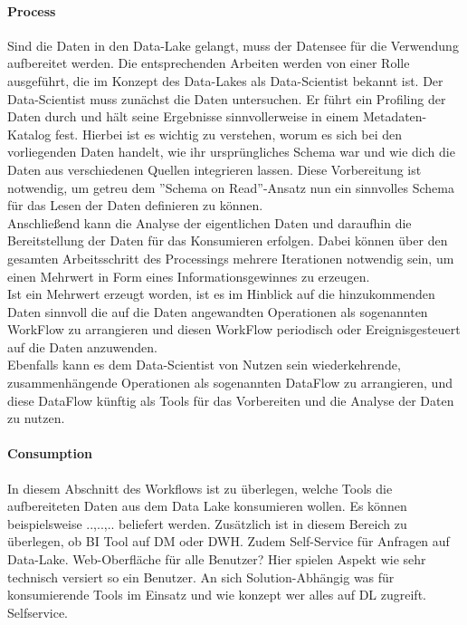 \documentclass[twoside,twocolumn]{article}
\begin{document}
\paragraph{Process}
		Sind die Daten in den Data-Lake gelangt, muss der Datensee für die Verwendung aufbereitet werden. Die entsprechenden Arbeiten werden von einer Rolle ausgeführt, die im Konzept des Data-Lakes als Data-Scientist bekannt ist.
		Der Data-Scientist muss zunächst die Daten untersuchen. Er führt ein Profiling der Daten durch und hält seine Ergebnisse sinnvollerweise in einem Metadaten-Katalog fest. Hierbei ist es wichtig zu verstehen, worum es sich bei den vorliegenden Daten handelt, wie ihr ursprüngliches Schema war und wie dich die Daten aus verschiedenen Quellen integrieren lassen. Diese Vorbereitung ist notwendig, um getreu dem ''Schema on Read''-Ansatz nun ein sinnvolles Schema für das Lesen der Daten definieren zu können.\\
		Anschließend kann die Analyse der eigentlichen Daten und daraufhin die Bereitstellung der Daten für das Konsumieren erfolgen. Dabei können über den gesamten Arbeitsschritt des Processings mehrere Iterationen notwendig sein, um einen Mehrwert in Form eines Informationsgewinnes zu erzeugen.\\
		Ist ein Mehrwert erzeugt worden, ist es im Hinblick auf die hinzukommenden Daten sinnvoll die auf die Daten angewandten Operationen als sogenannten WorkFlow zu arrangieren und diesen WorkFlow periodisch oder Ereignisgesteuert auf die Daten anzuwenden.\\
		Ebenfalls kann es dem Data-Scientist von Nutzen sein wiederkehrende, zusammenhängende Operationen als sogenannten DataFlow zu arrangieren, und diese DataFlow künftig als Tools für das Vorbereiten und die Analyse der Daten zu nutzen.\\
		\cite{src8}\cite{src12}
		
\paragraph{Consumption}
		In diesem Abschnitt des Workflows ist zu überlegen, welche Tools die aufbereiteten Daten aus dem Data Lake konsumieren wollen. Es können beispielsweise ..,..,.. beliefert werden.
		Zusätzlich ist in diesem Bereich zu überlegen, ob BI Tool auf DM oder DWH.
		Zudem Self-Service für Anfragen auf Data-Lake. Web-Oberfläche für alle Benutzer? Hier spielen Aspekt wie sehr technisch versiert so ein Benutzer.
		An sich Solution-Abhängig was für konsumierende Tools im Einsatz und wie konzept wer alles auf DL zugreift. Selfservice.\cite{src8}\cite{src12}
\end{document}
